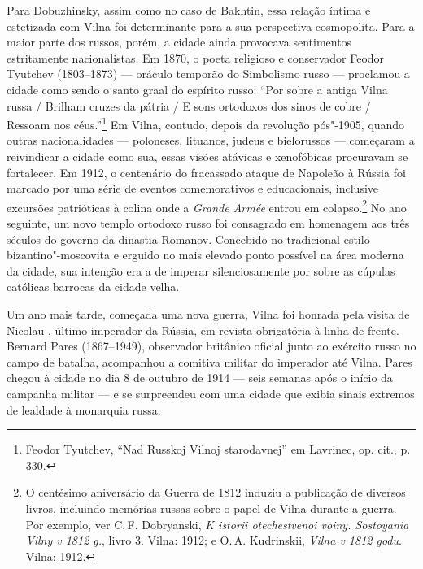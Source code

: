 Para Dobuzhinsky, assim como no caso de Bakhtin, essa relação íntima e
estetizada com Vilna foi determinante para a sua perspectiva
cosmopolita. Para a maior parte dos russos, porém, a cidade ainda
provocava sentimentos estritamente nacionalistas. Em 1870, o poeta
religioso e conservador Feodor Tyutchev (1803--1873) --- oráculo temporão
do Simbolismo russo --- proclamou a cidade como sendo o santo graal do
espírito russo: ``Por sobre a antiga Vilna russa / Brilham cruzes da
pátria / E sons ortodoxos dos sinos de cobre / Ressoam nos
céus.''\footnote{Feodor Tyutchev, ``Nad Russkoj Vilnoj starodavnej'' em Lavrinec, op. cit., p. 330.} Em Vilna, contudo, depois da revolução pós"-1905, quando outras nacionalidades --- poloneses, lituanos, judeus e
bielorussos --- começaram a reivindicar a cidade como sua, essas visões
atávicas e xenofóbicas procuravam se fortalecer. Em 1912, o centenário
do fracassado ataque de Napoleão à Rússia foi marcado por uma série de
eventos comemorativos e educacionais, inclusive excursões patrióticas à
colina onde a \textit{Grande Armée} entrou em colapso.\footnote{O centésimo aniversário da Guerra de 1812 induziu a publicação de diversos livros, incluindo memórias russas sobre o papel de Vilna durante a guerra. Por exemplo, ver C.\,F. Dobryanski, \textit{K istorii otechestvenoi voiny. Sostoyania Vilny v 1812 g.}, livro 3. Vilna: 1912; e O.\,A. Kudrinskii, \textit{Vilna v 1812 godu}. Vilna: 1912.} No ano seguinte, um novo templo ortodoxo russo foi consagrado em homenagem aos três séculos do governo da dinastia
Romanov. Concebido no tradicional estilo bizantino"-moscovita e erguido
no mais elevado ponto possível na área moderna da cidade, sua intenção
era a de imperar silenciosamente por sobre as cúpulas católicas barrocas
da cidade velha.

Um ano mais tarde, começada uma nova guerra, Vilna foi honrada pela
visita de Nicolau , último imperador da Rússia, em revista obrigatória
à linha de frente. Bernard Pares (1867--1949), observador britânico
oficial junto ao exército russo no campo de batalha, acompanhou a
comitiva militar do imperador até Vilna. Pares chegou à cidade no dia 8
de outubro de 1914 --- seis semanas após o início da campanha militar --- e
se surpreendeu com uma cidade que exibia sinais extremos de lealdade à
monarquia russa:

